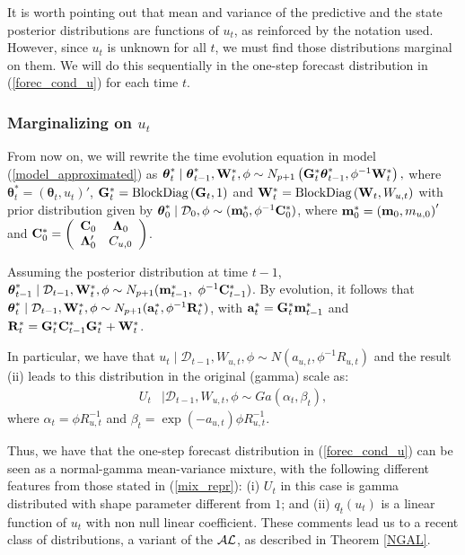 \documentclass[12pt,a4paper]{article}\usepackage[]{graphicx}\usepackage[]{color}\usepackage{subfigure}
\newcommand{\bftheta}{\boldsymbol{\theta}}
\newcommand{\mathD}{\mathcal{D}}
\begin{document}
It is worth pointing out that mean and variance of the predictive and the state posterior distributions are functions of $u_t$, as reinforced  by the notation used. 
However, since $u_t$ is unknown for all $t$, we must find those distributions marginal on them. We will do this sequentially in the one-step forecast distribution in (\ref{forec_cond_u}) for each time $t$.  
 

\subsubsection{Marginalizing on $u_t$}

From now on, we will rewrite the time evolution equation in model (\ref{model_approximated}) as $
\bftheta^*_t\mid \bftheta^*_{t-1},{\bf W}_t^*, \phi \sim N_{p+1} \left ( {\bf G}^*_t\bftheta^*_{t-1}, \phi^{-1} {\bf W}_t^*\right),$
where $\bftheta_t^* = \left(\bftheta_t,u_t\right)'$, 
${\bf G}_t^* = \mbox{BlockDiag}\left({\bf G}_t,1\right)$ and ${\bf W}_t^*=\mbox{BlockDiag}\left({\bf W}_t,W_{u,t}\right)$ with prior distribution given by $\bftheta_0^*\mid \mathD_0,\phi \sim ({\bf m}_0^*,\phi^{-1}{\bf C}_0^*)$, where 
${\bf m}_0^* = \left({\bf m}_0,m_{u,0}\right)'$ and ${\bf C}_0^*= \left(\begin{array}{cc}{\bf C}_0&	 {\bf \Lambda}_0\\{\bf \Lambda}_0' & C_{u,0}\end{array}\right)$.

Assuming the posterior distribution at time $t-1$, $\bftheta^*_{t-1}\mid  \mathD_{t-1},{\bf W}_t^*, \phi\sim N_{p+1}({\bf m}^*_{t-1},$
$\phi^{-1}{\bf C}^*_{t-1})$.
By evolution, it follows that $\bftheta^*_{t}\mid \mathD_{t-1},{\bf W}_t^*, \phi \sim N_{p+1}({\bf a}^*_{t},\phi^{-1}{\bf R}^*_{t})$, 
with ${\bf a}^*_t={\bf G}^*_t{\bf m}^*_{t-1}$ and ${\bf R}^*_t={\bf G}^*_t{\bf C}^*_{t-1}{\bf G}^*_t+{\bf W}_t^*$. 

In particular, we have that $u_{t}\mid \mathD_{t-1},W_{u,t},\phi\sim N(a_{u,t}, \phi^{-1} R_{u,t})$ and the result (ii) leads to this distribution in the original (gamma) scale as:
 \begin{align}\label{dist_ustar_t1}
  U_t&\mid \mathD_{t-1},W_{u,t},\phi\sim Ga(\alpha_t, \beta_t),
 \end{align}
 where $\alpha_t = \phi R_{u,t}^{-1}$ and $\beta_t=\exp(-a_{u,t})\phi R_{u,t}^{-1}.$

Thus, we have that the one-step forecast distribution in (\ref{forec_cond_u}) can be seen as a normal-gamma mean-variance mixture, with the following
different features from those stated in (\ref{mix_repr}): (i)  $U_t$ in this case is gamma distributed with shape parameter different from $1$; and (ii) $q_t(u_t)$ is a linear function of $u_t$ with non null linear coefficient. 
These comments lead us to a recent class of distributions, a variant of the $\cal{AL}$, as described in Theorem \ref{NGAL}.
\end{document}
